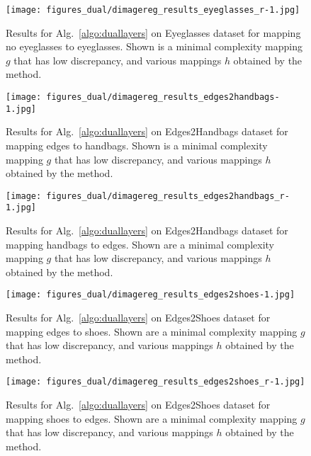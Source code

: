\documentclass{article} %
\begin{document}
\begin{figure}[t]
  \centering
\texttt{[image: figures\_dual/dimagereg\_results\_eyeglasses\_r-1.jpg]}
  \caption{\label{fig:alg8} Results for Alg.~\ref{algo:duallayers} on Eyeglasses dataset for mapping no eyeglasses to eyeglasses. Shown is a minimal complexity mapping $g$ that has low discrepancy, and various mappings $h$ obtained by the method.}

\end{figure}


\begin{figure}[t]
  \centering
\texttt{[image: figures\_dual/dimagereg\_results\_edges2handbags-1.jpg]}
  \caption{\label{fig:alg3} Results for Alg.~\ref{algo:duallayers} on Edges2Handbags dataset for mapping edges to handbags. Shown is a minimal complexity mapping $g$ that has low discrepancy, and various mappings $h$ obtained by the method.}
\end{figure}


\begin{figure}[t]
  \centering
\texttt{[image: figures\_dual/dimagereg\_results\_edges2handbags\_r-1.jpg]}
  \caption{\label{fig:alg4} Results for Alg.~\ref{algo:duallayers} on Edges2Handbags dataset for mapping handbags to edges. Shown are a minimal complexity mapping $g$ that has low discrepancy, and various mappings $h$ obtained by the method.}
\end{figure}


\begin{figure}[t]
  \centering
\texttt{[image: figures\_dual/dimagereg\_results\_edges2shoes-1.jpg]}
  \caption{\label{fig:alg5} Results for Alg.~\ref{algo:duallayers} on Edges2Shoes dataset for mapping edges to shoes. Shown are a minimal complexity mapping $g$ that has low discrepancy, and various mappings $h$ obtained by the method.}
\end{figure}


\begin{figure}[t]
  \centering
\texttt{[image: figures\_dual/dimagereg\_results\_edges2shoes\_r-1.jpg]}
  \caption{\label{fig:alg6} Results for Alg.~\ref{algo:duallayers} on Edges2Shoes dataset for mapping shoes to edges. Shown are a minimal complexity mapping $g$ that has low discrepancy, and various mappings $h$ obtained by the method.}
\end{figure}
\end{document}
